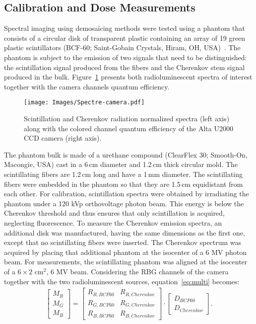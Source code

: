 \documentclass[12pt]{iopart}
\begin{document}
\subsection{Calibration and Dose Measurements}

Spectral imaging using demosaicing methods were tested using a phantom that consists of a circular disk of transparent plastic containing an array of 19 green plastic scintillators (BCF-60; Saint-Gobain Crystals, Hiram, OH, USA)~\cite{cloutier_deformable_2021_1, cloutier_deformable_2021_2}. The phantom is subject to the emission of two signals that need to be distinguished: the scintillation signal produced from the fibers and the Cherenkov stem signal produced in the bulk. Figure~\ref{fig:camera_filter} presents both radioluminescent spectra of interest together with the camera channels quantum efficiency. 
\begin{figure}[ht]
    \centering
    \texttt{[image: Images/Spectre-camera.pdf]}
    \caption{Scintillation and Cherenkov radiation normalized spectra (left axis) along with the colored channel quantum efficiency of the Alta U2000 CCD camera (right axis).}
    \label{fig:camera_filter}
\end{figure}
The phantom bulk is made of a urethane compound (ClearFlex 30; Smooth-On, Macongie, USA) cast in a 6\,cm diameter and 1.2\,cm thick circular mold. The scintillating fibers are 1.2\,cm long and have a 1\,mm diameter. The scintillating fibers were embedded in the phantom so that they are 1.5\,cm equidistant from each other. For calibration, scintillation spectra were obtained by irradiating the phantom under a 120 kVp orthovoltage photon beam. This energy is below the Cherenkov threshold and thus ensures that only scintillation is acquired, neglecting fluorescence. To measure the Cherenkov emission spectra, an additional disk was manufactured, having the same dimensions as the first one, except that no scintillating fibers were inserted. The Cherenkov spectrum was acquired by placing that additional phantom at the isocenter of a 6 MV photon beam. For measurements, the scintillating phantom was aligned at the isocenter of a $6\times2 \text{ cm}^2$, 6 MV beam. Considering the RBG channels of the camera together with the two radioluminescent sources, equation~\ref{eq:multi} becomes:
\begin{align}
    \begin{bmatrix}
    M_R \\
    M_G \\
    M_B 
    \end{bmatrix} = \begin{bmatrix}
    R_{R, BCF60} & R_{R, Cherenkov} \\
    R_{G, BCF60} & R_{G, Cherenkov} \\
    R_{B, BCF60} & R_{B, Cherenkov}
    \end{bmatrix} \cdot \begin{bmatrix}
    D_{BCF60} \\
    D_{Cherenkov}
    \end{bmatrix}.
\end{align}
\end{document}
